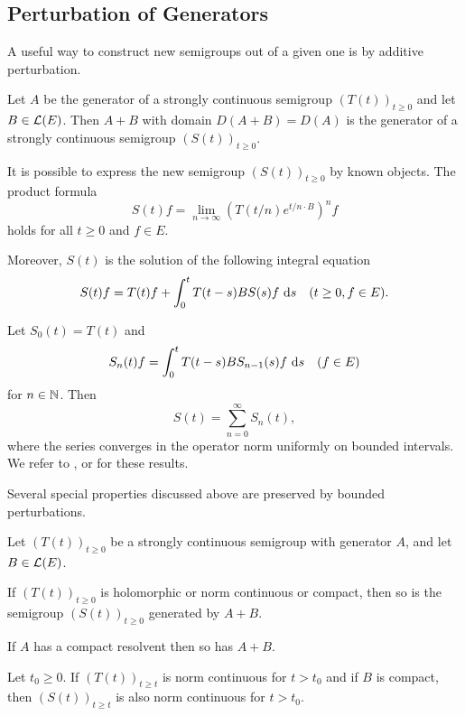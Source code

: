 \subsection{Perturbation of Generators} \label{subsec:a2-1.se8}
A useful way to construct new semigroups out of a given one is by additive perturbation.

\begin{theorem}\label{thm:a2-1.29}
Let $A$ be the generator of a strongly continuous semigroup $(T(t))_{t \geq 0}$ and let $B \in \mathcal{L}(E)$.
Then $A + B$ with domain $D(A+B) = D(A)$ is the generator of a strongly continuous semigroup $(S(t))_{t \geq 0}$.
\end{theorem}

It is possible to express the new semigroup $(S(t))_{t \geq 0}$ by known objects.
The product formula
\begin{equation}\label{eq:a2-1.8}
    S(t)f = \lim_{n \to \infty} (T(t/n)e^{t/n \cdot B})^{n}f
\end{equation}
holds for all $t \geq 0$ and $f \in E$.

Moreover, $S(t)$ is the solution of the following integral equation
\begin{equation}\label{eq:a2-1.9}
    S(t)f = T(t)f + \int_{0}^{t} T(t-s)BS(s)f\, \mathop{}\!\mathrm{d}{s} \quad (t \geq 0, f \in E).
\end{equation}

Let $S_{0}(t) = T(t)$ and
\begin{equation}\label{eq:a2-1.10}
    S_{n}(t)f = \int_{0}^{t} T(t-s)BS_{n-1}(s)f\, \mathop{}\!\mathrm{d}{s} \quad (f \in E)
\end{equation}
for $n \in \mathbb{N}$. Then
\begin{equation}\label{eq:a2-1.11}
    S(t) = \sum_{n=0}^{\infty} S_{n}(t),
\end{equation}
where the series converges in the operator norm uniformly on bounded intervals.
We refer to \citet[III.1]{davies:1980}, \citet[I.6]{goldstein:1985a} or \citet[Chapter 3]{pazy:1983} for these results.

Several special properties discussed above are preserved by bounded perturbations.

\begin{theorem} \label{thm:a2-1.30}
Let $(T(t))_{t \geq 0}$ be a strongly continuous semigroup with generator $A$, and let $B \in \mathcal{L}(E)$.

If $(T(t))_{t \geq 0}$ is holomorphic or norm continuous or compact, then so is the semigroup 
$(S(t))_{t \geq 0}$ 
generated by $A+B$.

If $A$ has a compact resolvent then so has $A+B$.

Let $t_{0} \geq 0$.
If $(T(t))_{t \geq t}$ is norm continuous for $t > t_{0}$ and if 
$B$ is compact, then $(S(t))_{t \geq t}$ is also norm continuous for $t > t_{0}$.
\end{theorem}

